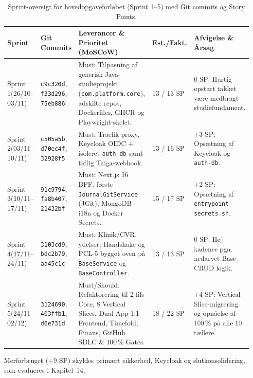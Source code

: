 \documentclass[11pt,a4paper]{article}
\begin{document}
\begin{table}[H]
\centering
\footnotesize
\begin{tabularx}{\textwidth}{P{2.1cm} P{2.6cm} Y P{1.6cm} P{3.3cm}}
\toprule
\textbf{Sprint} & \textbf{Git Commits} & \textbf{Leverancer \& Prioritet (MoSCoW)} & \textbf{Est./Fakt.} & \textbf{Afvigelse \& Årsag} \\
\midrule
Sprint 1\newline (26/10--03/11) & \texttt{c9c320d}, \texttt{f33d296}, \texttt{75eb886} & Must: Tilpasning af generisk Java-studieprojekt (\texttt{com.platform.core}), adskilte repos, Dockerfiles, GHCR og Playwright-skelet. & 13 / 13 SP & 0 SP: Hurtig opstart takket være medbragt studiefundament. \\
\midrule
Sprint 2\newline (03/11--10/11) & \texttt{c505a5b}, \texttt{d70ec4f}, \texttt{32928f5} & Must: Traefik proxy, Keycloak OIDC + isoleret \texttt{auth-db} samt tidlig Taiga-webhook. & 13 / 16 SP & +3 SP: Opsætning af Keycloak og \texttt{auth-db}. \\
\midrule
Sprint 3\newline (10/11--17/11) & \texttt{91c9794}, \texttt{fa8b407}, \texttt{21432bf} & Must: Next.js 16 BFF, første \texttt{JournalGitService} (JGit), MongoDB i18n og Docker Secrets. & 15 / 17 SP & +2 SP: Opsætning af \texttt{entrypoint-secrets.sh}. \\
\midrule
Sprint 4\newline (17/11--24/11) & \texttt{3103cd9}, \texttt{bdc2b79}, \texttt{aa45c1c} & Must: Klinik/CVR, ydelser, Handshake og PCL-5 bygget oven på \texttt{BaseService} og \texttt{BaseController}. & 13 / 13 SP & 0 SP: Høj kadence pga. nedarvet Base-CRUD logik. \\
\midrule
Sprint 5\newline (24/11--02/12) & \texttt{3124690}, \texttt{403ffb1}, \texttt{d6e731d} & Must/Should: Refaktorering til 2-fils Core, 8 Vertical Slices, Dual-App 1:1 Frontend, Timefold, Finans, GitHub SDLC \& 100\,\% Gates. & 18 / 22 SP & +4 SP: Vertical Slice-migrering og opnåelse af 100\,\% på alle 10 tællere. \\
\bottomrule
\end{tabularx}
\caption{Sprint-oversigt for hovedopgaveforløbet (Sprint 1--5) med Git commits og Story Points.}
\label{tab:sprint_log}
\end{table}

Merforbruget (+9 SP) skyldes primært sikkerhed, Keycloak og slutkonsolidering, som evalueres i Kapitel~14.
\end{document}
